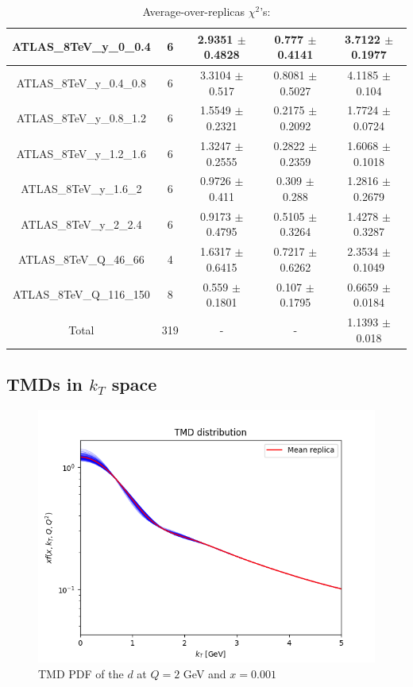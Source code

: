 \documentclass[
]{article}
\begin{document}
\begin{table}[h]
\begin{tabular}{|c|c|c|c|c|}
ATLAS\_8TeV\_y\_0\_0.4 & 6 & 2.9351 \(\pm\) 0.4828 & 0.777 \(\pm\)
0.4141 & 3.7122 \(\pm\) 0.1977 \\ \hline
ATLAS\_8TeV\_y\_0.4\_0.8 & 6 & 3.3104 \(\pm\) 0.517 & 0.8081 \(\pm\)
0.5027 & 4.1185 \(\pm\) 0.104 \\ \hline
ATLAS\_8TeV\_y\_0.8\_1.2 & 6 & 1.5549 \(\pm\) 0.2321 & 0.2175 \(\pm\)
0.2092 & 1.7724 \(\pm\) 0.0724 \\ \hline
ATLAS\_8TeV\_y\_1.2\_1.6 & 6 & 1.3247 \(\pm\) 0.2555 & 0.2822 \(\pm\)
0.2359 & 1.6068 \(\pm\) 0.1018 \\ \hline
ATLAS\_8TeV\_y\_1.6\_2 & 6 & 0.9726 \(\pm\) 0.411 & 0.309 \(\pm\)
0.288 & 1.2816 \(\pm\) 0.2679 \\ \hline
ATLAS\_8TeV\_y\_2\_2.4 & 6 & 0.9173 \(\pm\) 0.4795 & 0.5105 \(\pm\)
0.3264 & 1.4278 \(\pm\) 0.3287 \\ \hline
ATLAS\_8TeV\_Q\_46\_66 & 4 & 1.6317 \(\pm\) 0.6415 & 0.7217 \(\pm\)
0.6262 & 2.3534 \(\pm\) 0.1049 \\ \hline
ATLAS\_8TeV\_Q\_116\_150 & 8 & 0.559 \(\pm\) 0.1801 & 0.107 \(\pm\)
0.1795 & 0.6659 \(\pm\) 0.0184 \\ \hline
Total & 319 & - & - & 1.1393 \(\pm\) 0.018 \\ \hline

\end{tabular}

\caption{Average-over-replicas \(\chi^2\)'s:}

\end{table}

\hypertarget{tmds-in-k_t-space}{%
\subsection{\texorpdfstring{TMDs in \(k_T\)
space}{TMDs in k\_T space}}\label{tmds-in-k_t-space}}

\begin{figure}
\centering
\includegraphics{pngplots/tmd_1_2_0.001.png}
\caption{TMD PDF of the \(d\) at \(Q = 2\) GeV and \(x = 0.001\)}
\end{figure}
\end{document}
